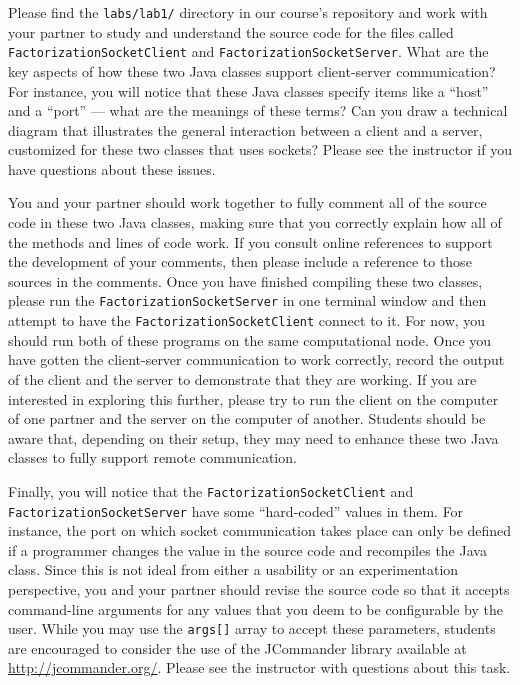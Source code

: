 Please find the {\tt labs/lab1/} directory in our course's repository and work with your partner to study and understand
the source code for the files called {\tt FactorizationSocketClient} and {\tt FactorizationSocketServer}. What are the
key aspects of how these two Java classes support client-server communication? For instance, you will notice that these
Java classes specify items like a ``host'' and a ``port'' --- what are the meanings of these terms? Can you draw a
technical diagram that illustrates the general interaction between a client and a server, customized for these two
classes that uses sockets? Please see the instructor if you have questions about these issues.

You and your partner should work together to fully comment all of the source code in these two Java classes, making sure
that you correctly explain how all of the methods and lines of code work. If you consult online references to support
the development of your comments, then please include a reference to those sources in the comments. Once you have
finished compiling these two classes, please run the {\tt FactorizationSocketServer} in one terminal window and then
attempt to have the {\tt FactorizationSocketClient} connect to it. For now, you should run both of these programs on the
same computational node. Once you have gotten the client-server communication to work correctly, record the output of
the client and the server to demonstrate that they are working. If you are interested in exploring this further, please
try to run the client on the computer of one partner and the server on the computer of another. Students should be aware
that, depending on their setup, they may need to enhance these two Java classes to fully support remote communication.

Finally, you will notice that the {\tt FactorizationSocketClient} and {\tt FactorizationSocketServer} have some
``hard-coded'' values in them. For instance, the port on which socket communication takes place can only be defined if a
programmer changes the value in the source code and recompiles the Java class. Since this is not ideal from either a
usability or an experimentation perspective, you and your partner should revise the source code so that it accepts
command-line arguments for any values that you deem to be configurable by the user. While you may use the {\tt args[]}
array to accept these parameters, students are encouraged to consider the use of the JCommander library available at
\url{http://jcommander.org/}. Please see the instructor with questions about this task.

